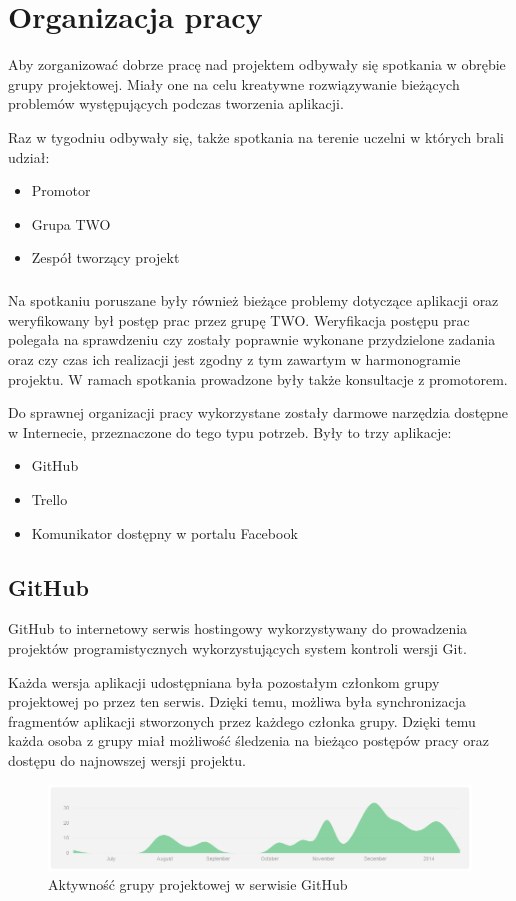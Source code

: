 \chapter{Organizacja pracy}



Aby zorganizować dobrze pracę nad projektem odbywały się spotkania w obrębie grupy projektowej. Miały one na celu kreatywne rozwiązywanie bieżących problemów występujących podczas tworzenia aplikacji. 

Raz w tygodniu odbywały się, także spotkania na terenie uczelni w których brali udział:
\begin{itemize}
\item Promotor
\item Grupa TWO
\item Zespół tworzący projekt
\end{itemize}

\paragraph{}
Na spotkaniu poruszane były również bieżące problemy dotyczące aplikacji oraz weryfikowany był postęp prac przez grupę TWO. Weryfikacja postępu prac polegała na sprawdzeniu czy zostały poprawnie wykonane przydzielone zadania oraz czy czas ich realizacji jest zgodny z tym zawartym w harmonogramie projektu. W ramach spotkania prowadzone były także konsultacje z promotorem.

Do sprawnej organizacji pracy wykorzystane zostały darmowe narzędzia dostępne w Internecie, przeznaczone do tego typu potrzeb. Były to trzy aplikacje:
\begin{itemize}
\item GitHub
\item Trello
\item Komunikator dostępny w portalu Facebook
\end{itemize}

\section{GitHub}
GitHub to internetowy serwis hostingowy wykorzystywany do prowadzenia projektów programistycznych wykorzystujących system kontroli wersji Git. 

Każda wersja aplikacji udostępniana była pozostałym członkom grupy projektowej po przez ten serwis. Dzięki temu, możliwa była synchronizacja fragmentów aplikacji stworzonych przez każdego członka grupy. Dzięki temu każda osoba z grupy miał możliwość śledzenia na bieżąco postępów pracy oraz dostępu do najnowszej wersji projektu. 
\begin{figure}[h]
	\centering
	\includegraphics[width=1.00\textwidth]{images/git.png}
	\caption{Aktywność grupy projektowej w serwisie GitHub}
\end{figure}

